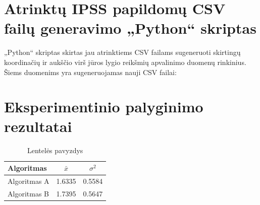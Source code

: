 \documentclass{VUMIFPSbakalaurinis}
\begin{document}
\section{Atrinktų IPSS papildomų CSV failų generavimo „Python“ skriptas} \label{script4}
„Python“ skriptas skirtas jau atrinktiems CSV failams sugeneruoti skirtingų koordinačių ir aukščio virš jūros lygio reikšmių apvalinimo duomenų rinkinius. Šiems duomenims yra sugeneruojamas nauji CSV failai:



\section{Eksperimentinio palyginimo rezultatai}
\begin{table}[H]\footnotesize
	\centering
	\caption{Lentelės pavyzdys}
	{\begin{tabular}{|l|c|c|} \hline
			Algoritmas & $\bar{x}$ & $\sigma^{2}$ \\
			\hline
			Algoritmas A  & 1.6335    & 0.5584       \\
			Algoritmas B  & 1.7395    & 0.5647       \\
			\hline
	\end{tabular}}
	\label{tab:table example}
\end{table}
\end{document}
